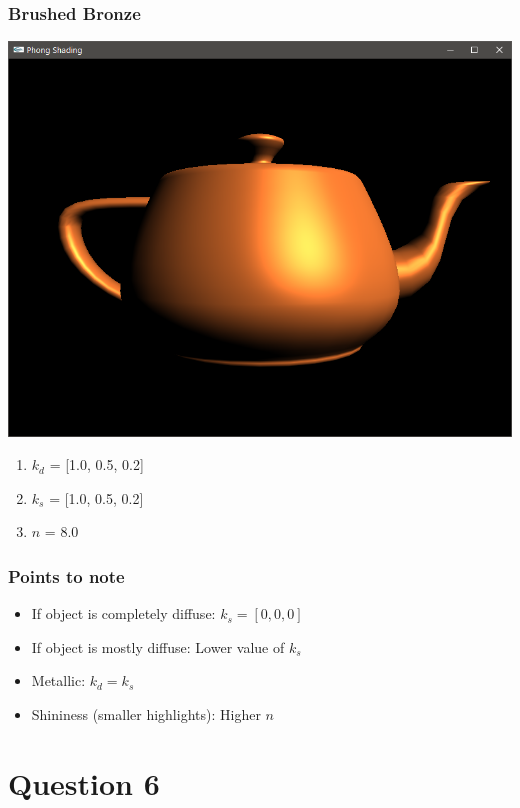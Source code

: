 \documentclass{beamer}
\begin{document}
\begin{frame}
    \frametitle{Brushed Bronze}

    \begin{center}
        \includegraphics[scale=0.2]{q5-bronze.png}
    \end{center}

    \begin{enumerate}
        \item $k_d$ = [1.0, 0.5, 0.2]
        \item $k_s$ = [1.0, 0.5, 0.2]
        \item $n$ = 8.0
    \end{enumerate}

\end{frame}

\begin{frame}
    \frametitle{Points to note}

    \begin{itemize}
        \item If object is completely diffuse: $k_s = [0, 0, 0]$
        \item If object is mostly diffuse: Lower value of $k_s$
        \item Metallic: $k_d = k_s$
        \item Shininess (smaller highlights): Higher $n$
    \end{itemize}

\end{frame}

\section{Question 6}
\end{document}
